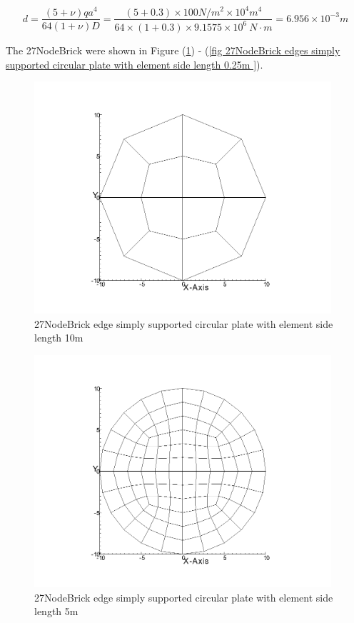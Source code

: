 \documentclass[fleqn,11pt,letter]{article}
\begin{document}
\begin{equation}
  d= \frac{(5+\nu)  q a^4}{64(1+\nu) D}=\frac{(5+0.3)\times 100 N/m^2 \times 10^4 m^4}{64\times(1+0.3) \times 9.1575 \times 10^6 \ N\cdot m}=6.956\times 10^{-3} m
\end{equation}



The 27NodeBrick were shown in Figure (\ref{fig 27NodeBrick edges simply supported circular plate with element side length 10m }) - (\ref{fig 27NodeBrick edges simply supported circular plate with element side length 0.25m }). 



\begin{figure}[H]
  \centering
  \includegraphics[width=11cm]{../Figure_files/27NodeBrick/circular_plate1.png}
  \caption{27NodeBrick edge simply supported circular plate with element side length 10m }
  \label{fig 27NodeBrick edges simply supported circular plate with element side length 10m }
\end{figure}

\newpage

\begin{figure}[H]
  \centering
  \includegraphics[width=11cm]{../Figure_files/27NodeBrick/circular_plate2.png}
  \caption{27NodeBrick edge simply supported circular plate with element side length 5m }
  \label{fig 27NodeBrick edges simply supported circular plate with element side length 5m }
\end{figure}
\end{document}
